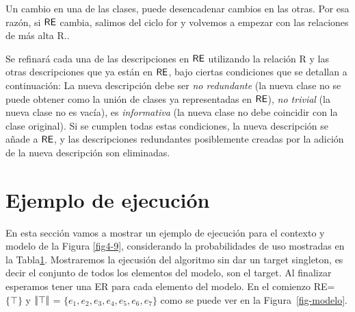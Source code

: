  Un cambio en una de las clases, puede desencadenar cambios en
las otras. Por esa raz\'on, si $\textsf{RE}$ cambia, salimos del ciclo for y volvemos a
empezar con las relaciones de m\'as alta R.\puse. 

Se refinar\'a cada una de las descripciones
en $\textsf{RE}$ utilizando la relaci\'on R y las otras descripciones que ya est\'an en
$\textsf{RE}$, bajo ciertas condiciones que se detallan a continuaci\'on: 
La nueva descripci\'on debe ser
\emph{no redundante} (la nueva clase no se puede obtener como la uni\'on de
clases ya representadas en $\textsf{RE}$), \emph{no trivial} (la nueva
clase no es vac\'{i}a), es \emph{informativa} (la nueva clase no debe
coincidir con la clase original). Si se cumplen todas estas condiciones,
la nueva descripci\'on se a\~nade a $\textsf{RE}$, y las descripciones redundantes
posiblemente creadas por la adici\'on de la nueva descripci\'on son
eliminadas.

\section{Ejemplo de ejecuci\'on}

En esta secci\'on vamos a mostrar un ejemplo de ejecuci\'on para el contexto y modelo de la Figura \ref{fig4-9}, considerando la probabilidades de uso mostradas en la Tabla\ref{}. Mostraremos la ejecusi\'on del algoritmo sin dar un target singleton, es decir el conjunto de todos los elementos del modelo, son el target. Al finalizar esperamos tener una ER para cada elemento del modelo.
En el comienzo RE=$\{\top\}$ y $|\!|\top|\!|$ = $\{e_1, e_2, e_3, e_4, e_5, e_6, e_7\}$ como se puede ver en la Figura~\ref{fig-modelo}.\\

